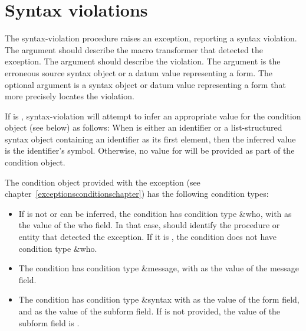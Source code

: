 \section{Syntax violations}

\begin{entry}{%
}

The {\cf syntax-violation} procedure raises an exception, reporting 
a syntax violation.  
The  argument should describe the macro transformer that
detected the exception.  The  argument should describe
the violation.
The  argument is the erroneous source syntax
object or a datum value representing a form. The optional  argument is a syntax
object or datum value representing a form that more precisely locates the
violation.

If  is \schfalse{}, {\cf syntax-violation} will attempt to
infer an appropriate value for the condition object (see below) as
follows:  When  is either an identifier or a
list-structured syntax object containing an identifier as its first element, then
the inferred value is the identifier's symbol.
Otherwise, no value for  will be provided as part of the
condition object.

The condition object provided with the exception (see
chapter~\ref{exceptionsconditionschapter}) has the following condition types:
%
\begin{itemize}
\item If  is not \schfalse or can be inferred, the condition has condition type
  {\cf \&who}, with  as the value of the {\cf who} field.  In
  that case,  should identify the procedure or entity that
  detected the exception.  If it is \schfalse, the condition does not
  have condition type {\cf \&who}.
\item The condition has condition type {\cf \&message}, with
   as the value of the {\cf message} field.
\item The condition has condition type {\cf \&syntax} 
  with  as the value of the {\cf form} field,
  and  as the value of the {\cf subform} field.
  If  is not provided, the value of the {\cf subform}
  field is \schfalse.
\end{itemize}
\end{entry}

